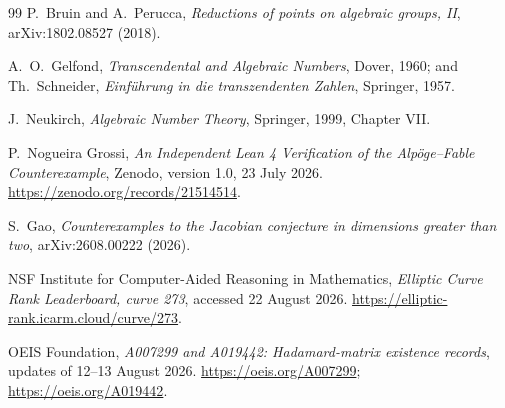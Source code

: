 \documentclass[11pt]{article}
\theoremstyle{definition}
\theoremstyle{remark}
\begin{document}
\begin{thebibliography}{99}
P.~Bruin and A.~Perucca,
\emph{Reductions of points on algebraic groups, II},
arXiv:1802.08527 (2018).

A.~O.~Gelfond,
\emph{Transcendental and Algebraic Numbers}, Dover, 1960;
and Th.~Schneider, \emph{Einf\"uhrung in die transzendenten Zahlen}, Springer, 1957.

J.~Neukirch,
\emph{Algebraic Number Theory}, Springer, 1999, Chapter VII.

P.~Nogueira Grossi,
\emph{An Independent Lean 4 Verification of the Alp\"oge--Fable Counterexample},
Zenodo, version 1.0, 23 July 2026.
\url{https://zenodo.org/records/21514514}.

S.~Gao,
\emph{Counterexamples to the Jacobian conjecture in dimensions greater than two},
arXiv:2608.00222 (2026).

NSF Institute for Computer-Aided Reasoning in Mathematics,
\emph{Elliptic Curve Rank Leaderboard, curve 273}, accessed 22 August 2026.
\url{https://elliptic-rank.icarm.cloud/curve/273}.

OEIS Foundation,
\emph{A007299 and A019442: Hadamard-matrix existence records},
updates of 12--13 August 2026.
\url{https://oeis.org/A007299}; \url{https://oeis.org/A019442}.

\end{thebibliography}
\end{document}
